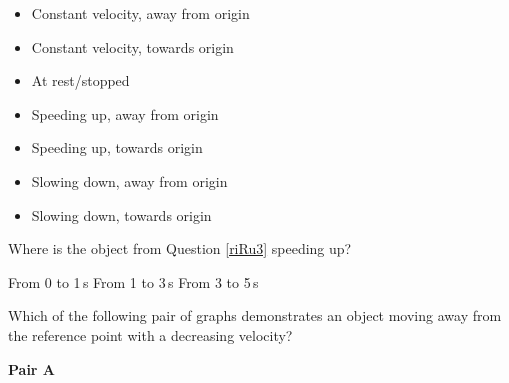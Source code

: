 \documentclass[answers]{exam}
\begin{document}
\begin{questions}
\begin{minipage}{0.45\textwidth}
\centering
{}
\end{minipage}%
\hspace{2em}
\begin{minipage}{0.45\textwidth}
    \centering
\begin{itemize}[itemsep=0pt]
    \item Constant velocity, away from origin
    \item Constant velocity, towards origin
    \item At rest/stopped
    \item Speeding up, away from origin
    \item Speeding up, towards origin
    \item Slowing down, away from origin
    \item Slowing down, towards origin
\end{itemize}
\end{minipage}


\question \label{Xszkg}
Where is the object from Question \ref{riRu3} speeding up?

\begin{randomizechoices}[norandomize]
    \choice From 0 to 1\,s
    \choice From 1 to 3\,s
    \correctchoice From 3 to 5\,s
\end{randomizechoices}

\clearpage
\question 
Which of the following pair of graphs demonstrates an object moving away from the reference point with a decreasing velocity?

\bigskip

\begin{minipage}{0.45\textwidth}
\centering
\textbf{Pair A}

\vspace{1ex}


\end{minipage}
\end{questions}
\end{document}
